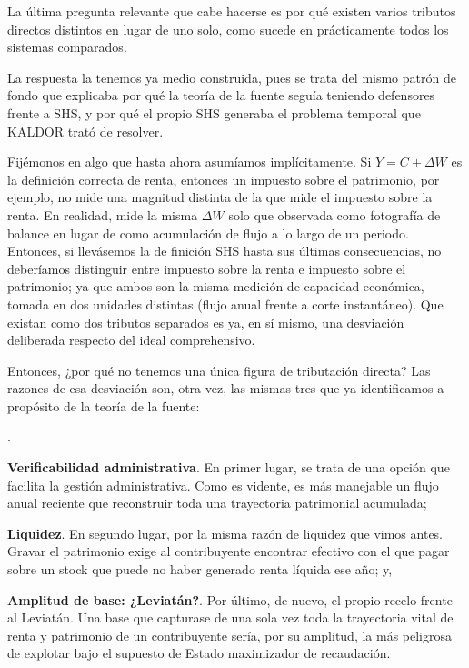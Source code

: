 \documentclass[10pt,a4paper]{article}
\newcounter{numitem}
\newenvironment{lnum}
      {\begin{list}{\arabic{numitem}.}{%
          \usecounter{numitem}%
          \setlength{\leftmargin}{1cm}%
          \setlength{\parskip}{3pt}%
          \setlength{\itemsep}{0pt}%
          \setlength{\parsep}{0pt}%
      }}
      {\end{list}}
\begin{document}
La última pregunta relevante que cabe hacerse es por qué existen varios tributos directos distintos en lugar de uno solo, como sucede en prácticamente todos los sistemas comparados. 

La respuesta la tenemos ya medio construida, pues se trata del mismo patrón de fondo que explicaba por qué la teoría de la fuente seguía teniendo defensores frente a SHS, y por qué el propio SHS generaba el problema temporal que KALDOR trató de resolver. 

Fijémonos en algo que hasta ahora asumíamos implícitamente. Si $Y = C + \Delta W$ es la definición correcta de renta, entonces un impuesto sobre el patrimonio, por ejemplo, no mide una magnitud distinta de la que mide el impuesto sobre la renta. En realidad, mide la misma $\Delta W$ solo que observada como fotografía de balance en lugar de como acumulación de flujo a lo largo de un periodo. Entonces, si llevásemos la de finición SHS hasta sus últimas consecuencias, no deberíamos distinguir entre impuesto sobre la renta e impuesto sobre el patrimonio; ya que ambos son la misma medición de capacidad económica, tomada en dos unidades distintas (flujo anual frente a corte instantáneo). Que existan como dos tributos separados es ya, en sí mismo, una desviación deliberada respecto del ideal comprehensivo. 

Entonces, ¿por qué no tenemos una única figura de tributación directa? Las razones de esa desviación son, otra vez, las mismas tres que ya identificamos a propósito de la teoría de la fuente:
\begin{lnum}
    \item \textbf{Verificabilidad administrativa}. En primer lugar, se trata de una opción que facilita la gestión administrativa. Como es vidente, es más manejable un flujo anual reciente que reconstruir toda una trayectoria patrimonial acumulada;
    \item \textbf{Liquidez}. En segundo lugar, por la misma razón de liquidez que vimos antes. Gravar el patrimonio exige al contribuyente encontrar efectivo con el que pagar sobre un stock que puede no haber generado renta líquida ese año; y,
    \item \textbf{Amplitud de base: ¿Leviatán?}. Por último, de nuevo, el propio recelo frente al Leviatán. Una base que capturase de una sola vez toda la trayectoria vital de renta y patrimonio de un contribuyente sería, por su amplitud, la más peligrosa de explotar bajo el supuesto de Estado maximizador de recaudación.
\end{lnum}
\end{document}
